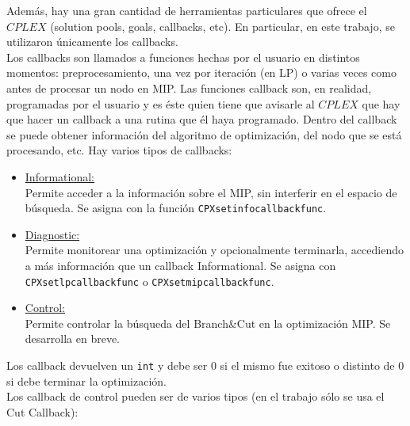 Además, hay una gran cantidad de herramientas particulares que ofrece el $CPLEX$ (solution pools, goals, callbacks, etc). En particular, en este trabajo, se utilizaron únicamente los callbacks.\\

Los callbacks son llamados a funciones hechas por el usuario en distintos momentos: preprocesamiento, una vez por iteración (en LP) o varias veces como antes de procesar un nodo en MIP. Las funciones callback son, en realidad, programadas por el usuario y es éste quien tiene que avisarle al $CPLEX$ que hay que hacer un callback a una rutina que él haya programado. Dentro del callback se puede obtener información del algoritmo de optimización, del nodo que se está procesando, etc. Hay varios tipos de callbacks:

\begin{itemize}
\item \underline{Informational:}\\
Permite acceder a la información sobre el MIP, sin interferir en el espacio de búsqueda. Se asigna con la función \verb_CPXsetinfocallbackfunc_.

\item \underline{Diagnostic:}\\
Permite monitorear una optimización y opcionalmente terminarla, accediendo a más información que un callback Informational. Se asigna con \verb_CPXsetlpcallbackfunc_ o \verb_CPXsetmipcallbackfunc_.

\item \underline{Control:}\\
Permite controlar la búsqueda del Branch\&Cut en la optimización MIP. Se desarrolla en breve.
\end{itemize}

Los callback devuelven un \verb_int_ y debe ser 0 si el mismo fue exitoso o distinto de 0 si debe terminar la optimización.\\

Los callback de control pueden ser de varios tipos (en el trabajo sólo se usa el Cut Callback):

